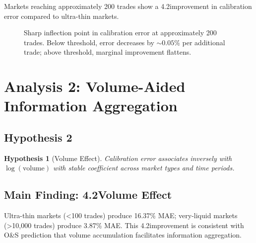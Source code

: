 \documentclass[a4paper,11pt]{article}
\theoremstyle{plain}
\newtheorem{hypothesis}[section]{Hypothesis}
\theoremstyle{definition}
\begin{document}
Markets reaching approximately 200 trades show a 4.2\times improvement in calibration error compared to ultra-thin markets.

\begin{figure}[h]
\centering
\small
{}
\caption{Sharp inflection point in calibration error at approximately 200 trades. Below threshold, error decreases by $\sim 0.05\%$ per additional trade; above threshold, marginal improvement flattens.}
\label{fig:threshold_main}
\end{figure}

\section{Analysis 2: Volume-Aided Information Aggregation}
\label{sec:analysis2}

\subsection{Hypothesis 2}

\begin{hypothesis}[Volume Effect]
Calibration error associates inversely with $\log(\text{volume})$ with stable coefficient across market types and time periods.
\end{hypothesis}

\subsection{Main Finding: 4.2\times Volume Effect}

Ultra-thin markets (<100 trades) produce 16.37\% MAE; very-liquid markets (>10,000 trades) produce 3.87\% MAE. This 4.2\times improvement is consistent with O&S prediction that volume accumulation facilitates information aggregation.
\end{document}
